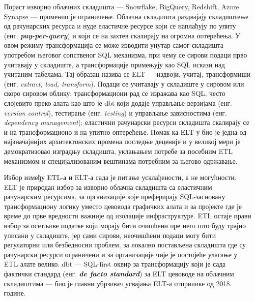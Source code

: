 Пораст изворно облачних складишта — Snowflake, BigQuery, Redshift, Azure Synapse — променио је ограничење. Облачна складишта раздвајају складиштење од рачунарских ресурса и нуде еластичне ресурсе који се наплаћују по упиту (енг. \textbf{\textit{pay-per-query}}) и који се на захтев скалирају на огромна оптерећења. У овом режиму трансформација се може изводити унутар самог складишта употребом његовог сопственог SQL механизма, при чему се сирови подаци прво учитавају у складиште, а трансформације примењују као SQL искази над учитаним табелама. Тај образац назива се ELT — издвоји, учитај, трансформиши (енг. \textit{extract, load, transform}). Подаци се учитавају у складиште у сировом или скоро сировом облику; трансформациони рад се изражава као SQL, често слојевито преко алата као што је dbt који додаје управљање верзијама (енг. \textit{version control}), тестирање (енг. \textit{testing}) и управљање зависностима (енг. \textit{dependency management}); еластични рачунарски ресурси складишта скалирају се и на трансформационо и на упитно оптерећење. Помак ка ELT-у био је једна од најзначајнијих архитектонских промена последње деценије и у великој мери је демократизовао изградњу складишта, уклањањем потребе за посебним ETL механизмом и специјализованим вештинама потребним за његово одржавање.

Избор између ETL-а и ELT-а сада је питање усклађености, а не могућности. ELT је природан избор за изворно облачна складишта са еластичним рачунарским ресурсима, за организације које преферирају SQL-засновану трансформациону логику уместо цевовода графичких алата и за пројекте где је време до прве вредности важније од изолације инфраструктуре. ETL остаје прави избор за осетљиве податке који морају бити очишћени пре него што буду трајно уписани у складиште, јер сами сирови, неочишћени подаци могу бити регулаторни или безбедносни проблем, за локално постављена складишта где су рачунарски ресурси ограничени и за организације чије је постојеће улагање у ETL алате велико. dbt — SQL-first оквир за трансформацију који је сада фактички стандард (енг. \textbf{\textit{de facto standard}}) за ELT цевоводе на облачним складиштима — био је главни убрзивач усвајања ELT-а отприлике од 2018. године.

